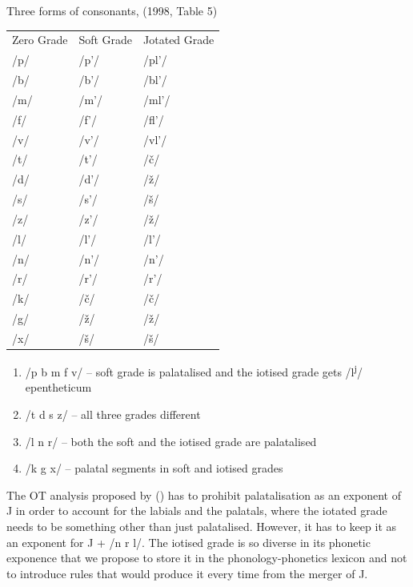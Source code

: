 \documentclass[a4paper, 12pt]{article}
\newcommand{\citeay}[2][]{
   \citeauthor{#2} (\citeyear[#1]{#2})}
\begin{document}
	\ex\label{t:threeforms} Three forms of consonants, \citeauthor{brown1998} (1998, Table 5) \\ 
\begin{tabular}{lll}
Zero Grade & Soft Grade & Jotated Grade \\
/p/        & /p'/       & /pl'/         \\
/b/        & /b'/       & /bl'/         \\
/m/        & /m'/       & /ml'/         \\
/f/        & /f'/       & /fl'/         \\
/v/        & /v'/       & /vl'/         \\
/t/        & /t'/       & /č/           \\
/d/        & /d'/       & /ž/           \\
/s/        & /s'/       & /š/           \\
/z/        & /z'/       & /ž/           \\
/l/        & /l'/       & /l'/          \\
/n/        & /n'/       & /n'/          \\
/r/        & /r'/       & /r'/          \\
/k/        & /č/        & /č/           \\
/g/        & /ž/        & /ž/      		\\
/x/        & /š/        & /š/          
\end{tabular}
	\xe
	
	\begin{enumerate}[$\gg$]
	\setlength\itemsep{0em}
		\item /p b m f v/ -- soft grade is palatalised and the iotised grade gets /l\textsuperscript{j}/ epentheticum
		\item /t d s z/ -- all three grades different
		\item /l n r/ -- both the soft and the iotised grade are palatalised
		\item /k g x/ -- palatal segments in soft and iotised grades
	\end{enumerate}
	The OT analysis proposed by \citeay{magomedova2017} has to prohibit palatalisation as an exponent of J in order to account for the labials and the palatals, where the iotated grade needs to be something other than just palatalised. However, it has to keep it as an exponent for J + /n r l/. The iotised grade is so diverse in its phonetic exponence that we propose to store it in the phonology-phonetics lexicon and not to introduce rules that would produce it every time from the merger of J.

\printbibliography
\end{document}
